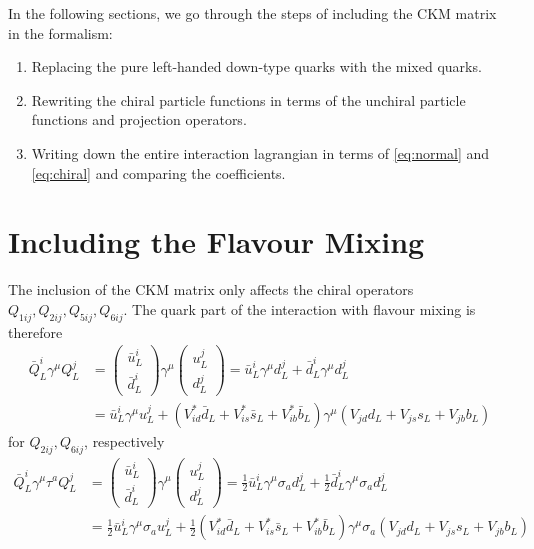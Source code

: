 In the following sections, we go through the steps of including the CKM matrix in the formalism:
\begin{enumerate}
	\item Replacing the pure left-handed down-type quarks with the mixed quarks.
	\item Rewriting the chiral particle functions in terms of the unchiral particle functions and projection operators.
	\item Writing down the entire interaction lagrangian in terms of \eqref{eq:normal} and \eqref{eq:chiral} and comparing the coefficients.
\end{enumerate}

\section{Including the Flavour Mixing}
The inclusion of the CKM matrix only affects the chiral operators $Q_{1ij},Q_{2ij},Q_{5ij},Q_{6ij}$. The quark part of the interaction with flavour mixing is therefore
\begin{align*}
	\bar{Q}_L^i\gamma^\mu Q_L^j &= \begin{pmatrix}
	\bar{u}_L^i \\ \bar{d}_L^i
	\end{pmatrix}
	\gamma^\mu \begin{pmatrix}
	u_L^j \\ d_L^j
	\end{pmatrix}
	= \bar{u}_L^i\gamma^\mu d_L^j + \bar{d}_L^i\gamma^\mu d_L^j \\
	&= \bar{u}_L^i\gamma^\mu u_L^j + (V_{id}^*\bar{d}_L + V_{is}^*\bar{s}_L+V_{ib}^*\bar{b}_L)\gamma^\mu(V_{jd}d_L+V_{js}s_L+V_{jb}b_L)
\end{align*}
for $Q_{2ij}, Q_{6ij}$, respectively
\begin{align*}
	\bar{Q}_L^i\gamma^\mu\tau^a Q_L^j &=  \begin{pmatrix}
	\bar{u}_L^i \\ \bar{d}_L^i
	\end{pmatrix}
	\gamma^\mu \begin{pmatrix}
	u_L^j \\ d_L^j
	\end{pmatrix}
	= \frac{1}{2}\bar{u}_L^i\gamma^\mu \sigma_a d_L^j + \frac{1}{2}\bar{d}_L^i\gamma^\mu\sigma_a d_L^j \\
	&= \frac{1}{2}\bar{u}_L^i\gamma^\mu \sigma_a u_L^j + \frac{1}{2}(V_{id}^*\bar{d}_L + V_{is}^*\bar{s}_L+V_{ib}^*\bar{b}_L)\gamma^\mu\sigma_a(V_{jd}d_L+V_{js}s_L+V_{jb}b_L)
\end{align*}
